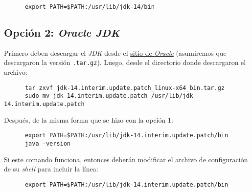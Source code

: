     \begin{verbatim}
      export PATH=$PATH:/usr/lib/jdk-14/bin
    \end{verbatim}

  \subsection{Opción 2: \textit{Oracle JDK}}
    Primero deben descargar el \textit{JDK} desde el
    \href{https://www.oracle.com/java/technologies/javase-jdk14-downloads.html}{sitio de 
    \textit{Oracle}} (asumiremos que descargaron la versión \texttt{.tar.gz}).
    Luego, desde el directorio donde descargaron el archivo:

    \begin{verbatim}
      tar zxvf jdk-14.interim.update.patch_linux-x64_bin.tar.gz
      sudo mv jdk-14.interim.update.patch /usr/lib/jdk-14.interim.update.patch
    \end{verbatim}

    Después, de la misma forma que se hizo con la opción 1:
    
    \begin{verbatim}
      export PATH=$PATH:/usr/lib/jdk-14.interim.update.patch/bin
      java -version
    \end{verbatim}

    Si este comando funciona, entonces deberán modificar el archivo de configuración de su
    \textit{shell} para incluir la línea:

    \begin{verbatim}
      export PATH=$PATH:/usr/lib/jdk-14.interim.update.patch/bin
    \end{verbatim}
%